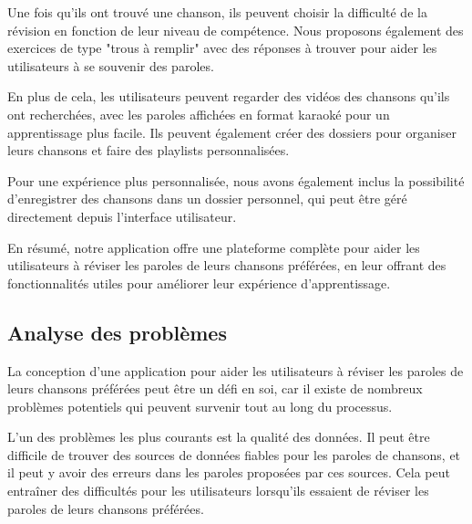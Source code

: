 \documentclass[12pt,french]{article}
\begin{document}
Une fois qu'ils ont trouvé une chanson, ils peuvent choisir la difficulté de la révision en fonction de leur niveau de compétence. Nous proposons également des exercices de type "trous à remplir" avec des réponses à trouver pour aider les utilisateurs à se souvenir des paroles.
\newline 

En plus de cela, les utilisateurs peuvent regarder des vidéos des chansons qu'ils ont recherchées, avec les paroles affichées en format karaoké pour un apprentissage plus facile. Ils peuvent également créer des dossiers pour organiser leurs chansons et faire des playlists personnalisées.
\newline 

Pour une expérience plus personnalisée, nous avons également inclus la possibilité d'enregistrer des chansons dans un dossier personnel, qui peut être géré directement depuis l'interface utilisateur.
\newline 

En résumé, notre application offre une plateforme complète pour aider les utilisateurs à réviser les paroles de leurs chansons préférées, en leur offrant des fonctionnalités utiles pour améliorer leur expérience d'apprentissage.

\newpage

\vspace*{1cm}

\subsection{Analyse des problèmes}


La conception d'une application pour aider les utilisateurs à réviser les paroles de leurs chansons préférées peut être un défi en soi, car il existe de nombreux problèmes potentiels qui peuvent survenir tout au long du processus.
\newline

L'un des problèmes les plus courants est la qualité des données. Il peut être difficile de trouver des sources de données fiables pour les paroles de chansons, et il peut y avoir des erreurs dans les paroles proposées par ces sources. Cela peut entraîner des difficultés pour les utilisateurs lorsqu'ils essaient de réviser les paroles de leurs chansons préférées.
\newline
\end{document}
